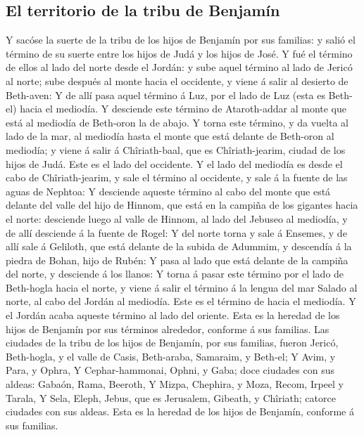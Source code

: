 \hypertarget{el-territorio-de-la-tribu-de-benjamuxedn}{%
\subsection{El territorio de la tribu de
Benjamín}\label{el-territorio-de-la-tribu-de-benjamuxedn}}

 Y sacóse la suerte de la tribu de los hijos de Benjamín
por sus familias: y salió el término de su suerte entre los hijos de
Judá y los hijos de José.  Y fué el término de ellos al
lado del norte desde el Jordán: y sube aquel término al lado de Jericó
al norte; sube después al monte hacia el occidente, y viene á salir al
desierto de Beth-aven:  Y de allí pasa aquel término á Luz,
por el lado de Luz (esta es Beth-el) hacia el mediodía. Y desciende este
término de Ataroth-addar al monte que está al mediodía de Beth-oron la
de abajo.  Y torna este término, y da vuelta al lado de la
mar, al mediodía hasta el monte que está delante de Beth-oron al
mediodía; y viene á salir á Chîriath-baal, que es Chîriath-jearim,
ciudad de los hijos de Judá. Este es el lado del occidente.
 Y el lado del mediodía es desde el cabo de
Chîriath-jearim, y sale el término al occidente, y sale á la fuente de
las aguas de Nephtoa:  Y desciende aqueste término al cabo
del monte que está delante del valle del hijo de Hinnom, que está en la
campiña de los gigantes hacia el norte: desciende luego al valle de
Hinnom, al lado del Jebuseo al mediodía, y de allí desciende á la fuente
de Rogel:  Y del norte torna y sale á Ensemes, y de allí
sale á Geliloth, que está delante de la subida de Adummim, y descendía á
la piedra de Bohan, hijo de Rubén:  Y pasa al lado que está
delante de la campiña del norte, y desciende á los llanos: 
Y torna á pasar este término por el lado de Beth-hogla hacia el norte, y
viene á salir el término á la lengua del mar Salado al norte, al cabo
del Jordán al mediodía. Este es el término de hacia el mediodía.
 Y el Jordán acaba aqueste término al lado del oriente.
Esta es la heredad de los hijos de Benjamín por sus términos alrededor,
conforme á sus familias.  Las ciudades de la tribu de los
hijos de Benjamín, por sus familias, fueron Jericó, Beth-hogla, y el
valle de Casis,  Beth-araba, Samaraim, y Beth-el;
 Y Avim, y Para, y Ophra,  Y Cephar-hammonai,
Ophni, y Gaba; doce ciudades con sus aldeas:  Gabaón, Rama,
Beeroth,  Y Mizpa, Chephira, y Moza,  Recom,
Irpeel y Tarala,  Y Sela, Eleph, Jebus, que es Jerusalem,
Gibeath, y Chîriath; catorce ciudades con sus aldeas. Esta es la heredad
de los hijos de Benjamín, conforme á sus familias.

